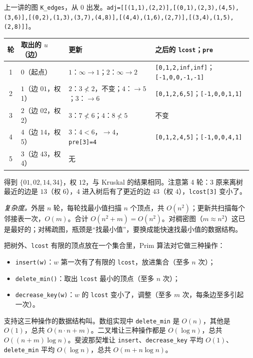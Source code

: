 \begin{example}\label{ex:mst-prim:array}
上一讲的图 \texttt{K\_edges}，从 $0$ 出发。\texttt{adj=[[(1,1),(2,2)],[(0,1),(2,3),(4,5),(3,6)],[(0,2),(1,3),(3,7),(4,8)],[(4,4),(1,6),(2,7)],[(3,4),(1,5),(2,8)]]}。
\begin{center}
\small
\begin{tabular}{cp{2.6cm}p{4.2cm}p{4.2cm}}
\toprule
轮 & 取出的 $u$（边） & 更新 & 之后的 \texttt{lcost}；\texttt{pre} \\
\midrule
1 & $0$（起点） & $1$：$\infty\to1$；$2$：$\infty\to2$ & \texttt{[0,1,2,inf,inf]}；\texttt{[-1,0,0,-1,-1]} \\
2 & $1$（边 $01$，权 1） & $2$：$3\not<2$，不变；$4$：$\to5$；$3$：$\to6$ & \texttt{[0,1,2,6,5]}；\texttt{[-1,0,0,1,1]} \\
3 & $2$（边 $02$，权 2） & $3$：$7\not<6$；$4$：$8\not<5$ & 不变 \\
4 & $4$（边 $14$，权 5） & $3$：$4<6$，$\to4$，\texttt{pre[3]=4} & \texttt{[0,1,2,4,5]}；\texttt{[-1,0,0,4,1]} \\
5 & $3$（边 $43$，权 4） & 无 & \\
\bottomrule
\end{tabular}
\end{center}
得到 $\{01,02,14,34\}$，权 $12$，与 Kruskal 的结果相同。注意第 4 轮：$3$ 原来离树最近的边是 $13$（权 $6$），$4$ 进入树后有了更近的边 $43$（权 $4$），\texttt{lcost[3]} 变小了。
\end{example}

\emph{复杂度。}外层 $n$ 轮，每轮找最小值扫描 $n$ 个顶点，共 $O(n^2)$；更新共扫描每个邻接表一次，$O(m)$。合计 $O(n^2+m)=O(n^2)$。对稠密图（$m\approx n^2$）这已是最好的；对稀疏图，瓶颈是“找最小值”，要换成能快速找最小值的数据结构。


把树外、\texttt{lcost} 有限的顶点放在一个集合里，Prim 算法对它做三种操作：
\begin{itemize}
\item \texttt{insert(w)}：$w$ 第一次有了有限的 \texttt{lcost}，放进集合（至多 $n$ 次）；
\item \texttt{delete\_min()}：取出 \texttt{lcost} 最小的顶点（至多 $n$ 次）；
\item \texttt{decrease\_key(w)}：$w$ 的 \texttt{lcost} 变小了，调整（至多 $m$ 次，每条边至多引起一次）。
\end{itemize}
支持这三种操作的数据结构叫。数组实现中 \texttt{delete\_min} 是 $O(n)$，其他是 $O(1)$，总共 $O(n\cdot n+m)$。二叉堆让三种操作都是 $O(\log n)$，总共 $O((n+m)\log n)$。斐波那契堆让 \texttt{insert}、\texttt{decrease\_key} 平均 $O(1)$、\texttt{delete\_min} 平均 $O(\log n)$，总共 $O(m+n\log n)$。

